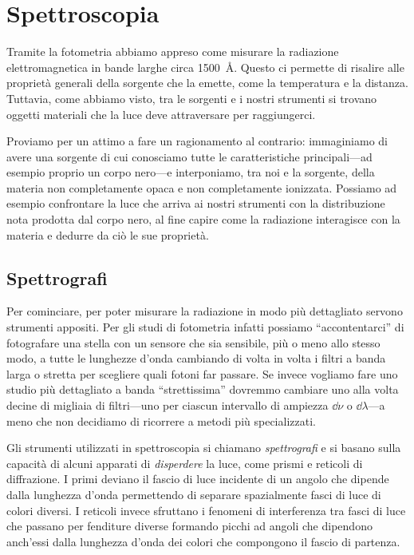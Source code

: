 \chapter{Spettroscopia}
Tramite la fotometria abbiamo appreso come misurare la radiazione elettromagnetica in bande larghe circa \SI{1500}{\angstrom}. Questo ci permette di risalire alle proprietà generali della sorgente che la emette, come la temperatura e la distanza. Tuttavia, come abbiamo visto, tra le sorgenti e i nostri strumenti si trovano oggetti materiali che la luce deve attraversare per raggiungerci.

Proviamo per un attimo a fare un ragionamento al contrario: immaginiamo di avere una sorgente di cui conosciamo tutte le caratteristiche principali---ad esempio proprio un corpo nero---e interponiamo, tra noi e la sorgente, della materia non completamente opaca e non completamente ionizzata. Possiamo ad esempio confrontare la luce che arriva ai nostri strumenti con la distribuzione nota prodotta dal corpo nero, al fine capire come la radiazione interagisce con la materia e dedurre da ciò le sue proprietà.
\section{Spettrografi}\label{s:spettrografi}
    Per cominciare, per poter misurare la radiazione in modo più dettagliato servono strumenti appositi. Per gli studi di fotometria infatti possiamo ``accontentarci'' di fotografare una stella con un sensore che sia sensibile, più o meno allo stesso modo, a tutte le lunghezze d'onda cambiando di volta in volta i filtri a banda larga o stretta per scegliere quali fotoni far passare. Se invece vogliamo fare uno studio più dettagliato a banda ``strettissima'' dovremmo cambiare uno alla volta decine di migliaia di filtri---uno per ciascun intervallo di ampiezza $\dd{\nu}$ o $\dd{\lambda}$---a meno che non decidiamo di ricorrere a metodi più specializzati.

    Gli strumenti utilizzati in spettroscopia si chiamano \emph{spettrografi} e si basano sulla capacità di alcuni apparati di \emph{disperdere} la luce, come prismi e reticoli di diffrazione. I primi deviano il fascio di luce incidente di un angolo che dipende dalla lunghezza d'onda permettendo di separare spazialmente fasci di luce di colori diversi. I reticoli invece sfruttano i fenomeni di interferenza tra fasci di luce che passano per fenditure diverse formando picchi ad angoli che dipendono anch'essi dalla lunghezza d'onda dei colori che compongono il fascio di partenza.

